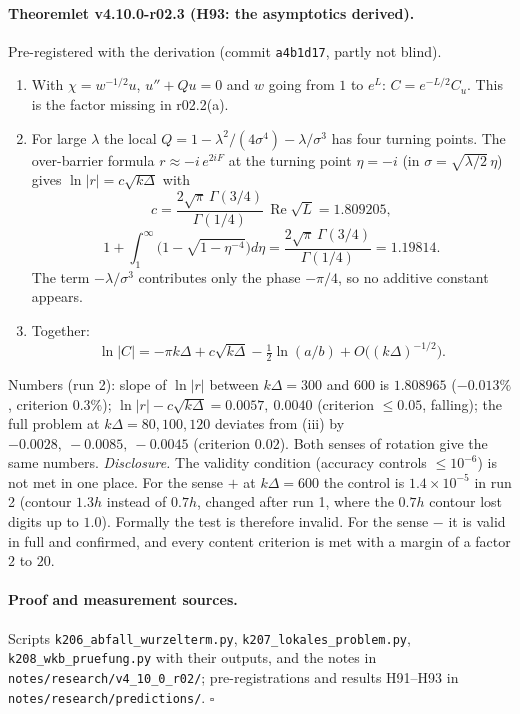 \paragraph{Theoremlet v4.10.0-r02.3 (H93: the asymptotics derived).}
Pre-registered with the derivation (commit \texttt{a4b1d17}, partly not blind).
\begin{enumerate}[leftmargin=2em]
\item[(i)] With \(\chi=w^{-1/2}u\), \(u''+Qu=0\) and \(w\) going from \(1\) to \(e^L\): \(C=e^{-L/2}C_u\).  This is the factor missing in r02.2(a).
\item[(ii)] For large \(\lambda\) the local \(Q=1-\lambda^2/(4\sigma^4)-\lambda/\sigma^3\) has four turning points.  The over-barrier formula
\(r\approx-i\,e^{2iF}\) at the turning point \(\eta=-i\) (in \(\sigma=\sqrt{\lambda/2}\,\eta\)) gives \(\ln|r|=c\sqrt{k\Delta}\) with
\[
c=\frac{2\sqrt\pi\,\Gamma(3/4)}{\Gamma(1/4)}\,\operatorname{Re}\sqrt L=1.809205,
\]
\[
1+\int_1^\infty\bigl(1-\sqrt{1-\eta^{-4}}\bigr)d\eta=\frac{2\sqrt\pi\,\Gamma(3/4)}{\Gamma(1/4)}=1.19814.
\]
The term \(-\lambda/\sigma^3\) contributes only the phase \(-\pi/4\), so no additive constant appears.
\item[(iii)] Together:
\[
\ln|C|=-\pi k\Delta+c\sqrt{k\Delta}-\tfrac12\ln(a/b)+O\bigl((k\Delta)^{-1/2}\bigr).
\]
\end{enumerate}
Numbers (run 2): slope of \(\ln|r|\) between \(k\Delta=300\) and \(600\) is \(1.808965\) (\(-0.013\%\), criterion \(0.3\%\)); \(\ln|r|-c\sqrt{k\Delta}=0.0057,\ 0.0040\)
(criterion \(\le0.05\), falling); the full problem at \(k\Delta=80,100,120\) deviates from (iii) by \(-0.0028,\ -0.0085,\ -0.0045\) (criterion \(0.02\)).  Both
senses of rotation give the same numbers.
\emph{Disclosure.}  The validity condition (accuracy controls \(\le10^{-6}\)) is not met in one place.  For the sense \(+\) at \(k\Delta=600\) the control is
\(1.4\times10^{-5}\) in run 2 (contour \(1.3h\) instead of \(0.7h\), changed after run 1, where the \(0.7h\) contour lost digits up to \(1.0\)).  Formally the
test is therefore invalid.  For the sense \(-\) it is valid in full and confirmed, and every content criterion is met with a margin of a factor
\(2\) to \(20\).

\paragraph{Proof and measurement sources.}
Scripts \texttt{k206\_\allowbreak abfall\_\allowbreak wurzelterm.py}, \texttt{k207\_\allowbreak lokales\_\allowbreak problem.py},
\texttt{k208\_\allowbreak wkb\_\allowbreak pruefung.py} with their outputs, and the notes in \texttt{notes/\allowbreak research/\allowbreak v4\_10\_0\_r02/};
pre-registrations and results H91--H93 in \texttt{notes/\allowbreak research/\allowbreak predictions/}.  \(\square\)

